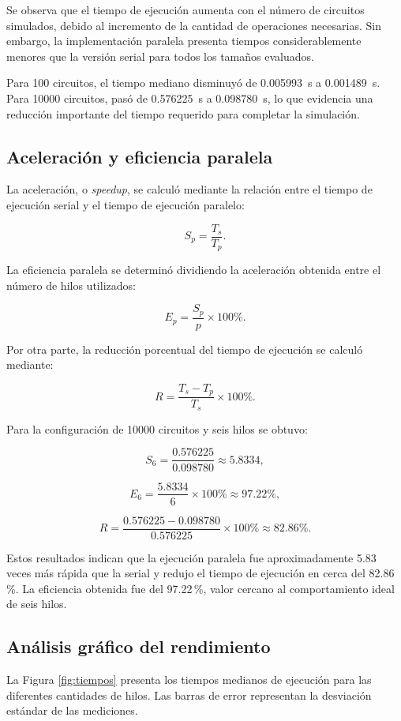 \documentclass[11pt,a4paper]{article}
\begin{document}
Se observa que el tiempo de ejecución aumenta con el número de circuitos simulados, debido al incremento de la cantidad de operaciones necesarias. Sin embargo, la implementación paralela presenta tiempos considerablemente menores que la versión serial para todos los tamaños evaluados.

Para 100 circuitos, el tiempo mediano disminuyó de \SI{0.005993}{s} a \SI{0.001489}{s}. Para 10000 circuitos, pasó de \SI{0.576225}{s} a \SI{0.098780}{s}, lo que evidencia una reducción importante del tiempo requerido para completar la simulación.

\subsection{Aceleración y eficiencia paralela}

La aceleración, o \textit{speedup}, se calculó mediante la relación entre el tiempo de ejecución serial y el tiempo de ejecución paralelo:

\[
S_p=\frac{T_s}{T_p}.
\]

La eficiencia paralela se determinó dividiendo la aceleración obtenida entre el número de hilos utilizados:

\[
E_p=\frac{S_p}{p}\times100\%.
\]

Por otra parte, la reducción porcentual del tiempo de ejecución se calculó mediante:

\[
R=\frac{T_s-T_p}{T_s}\times100\%.
\]

Para la configuración de 10000 circuitos y seis hilos se obtuvo:

\[
S_6=\frac{0.576225}{0.098780}
\approx 5.8334,
\]

\[
E_6=\frac{5.8334}{6}\times100\%
\approx 97.22\%,
\]

\[
R=\frac{0.576225-0.098780}{0.576225}
\times100\%
\approx 82.86\%.
\]

Estos resultados indican que la ejecución paralela fue aproximadamente 5.83 veces más rápida que la serial y redujo el tiempo de ejecución en cerca del 82.86\,\%. La eficiencia obtenida fue del 97.22\,\%, valor cercano al comportamiento ideal de seis hilos.

\subsection{Análisis gráfico del rendimiento}

La Figura \ref{fig:tiempos} presenta los tiempos medianos de ejecución para las diferentes cantidades de hilos. Las barras de error representan la desviación estándar de las mediciones.
\end{document}

